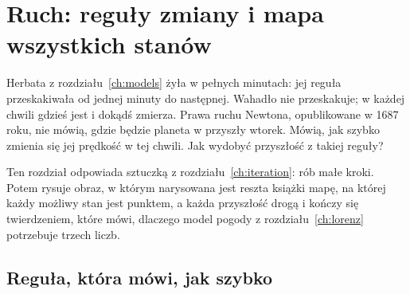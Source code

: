 
\chapter{Ruch: reguły zmiany i mapa wszystkich stanów}
\label{ch:motion}

\noindent
Herbata z rozdziału~\ref{ch:models} żyła w pełnych minutach: jej reguła
przeskakiwała od jednej minuty do następnej. Wahadło nie przeskakuje; w każdej
chwili gdzieś jest i dokądś zmierza. Prawa ruchu Newtona, opublikowane w 1687
roku, nie mówią, gdzie będzie planeta w przyszły wtorek. Mówią, jak szybko
zmienia się jej prędkość w tej chwili. Jak wydobyć przyszłość z takiej
reguły?

Ten rozdział odpowiada sztuczką z rozdziału~\ref{ch:iteration}: rób małe
kroki. Potem rysuje obraz, w którym narysowana jest reszta książki \dash{}
mapę, na której każdy możliwy stan jest punktem, a każda przyszłość drogą
\dash{} i kończy się twierdzeniem, które mówi, dlaczego model pogody z
rozdziału~\ref{ch:lorenz} potrzebuje trzech liczb.

\begin{outcomes}
\end{outcomes}

\section{Reguła, która mówi, jak szybko}
\label{sec:ch04-rates}

